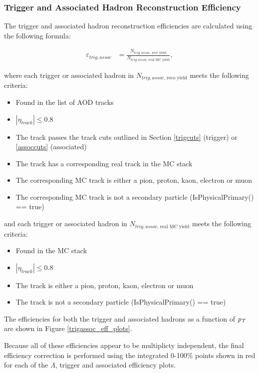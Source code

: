 \documentclass[ALICE,manyauthors]{ALICE_analysis_notes}
\begin{document}
\subsubsection{Trigger and Associated Hadron Reconstruction Efficiency}
\label{trigassoc_efficiency}

The trigger and associated hadron reconstruction efficiencies are calculated using the following formula:

\begin{align*}
	\varepsilon_{trig, assoc} &=  \frac{N_{trig, assoc\text{, reco yield}}}{N_{trig, assoc\text{, real MC yield}}},
\end{align*}

where each trigger or associated hadron in $N_{trig, assoc\text{, reco yield}}$ meets the following criteria:

\begin{itemize}
	\item Found in the list of AOD tracks
	\item $|\eta_{track}| \leq 0.8$
	\item The track passes the track cuts outlined in Section \ref{trigcuts} (trigger) or \ref{assoccuts} (associated)
	\item The track has a corresponding real track in the MC stack
	\item The corresponding MC track is either a pion, proton, kaon, electron or muon
	\item The corresponding MC track is not a secondary particle (IsPhysicalPrimary() == true)
\end{itemize}

and each trigger or associated hadron in $N_{trig, assoc\text{, real MC yield}}$ meets the following criteria:

\begin{itemize}
	\item Found in the MC stack
	\item $|\eta_{track}| \leq 0.8$
	\item The track is either a pion, proton, kaon, electron or muon
	\item The track is not a secondary particle (IsPhysicalPrimary() == true)
\end{itemize}

The efficiencies for both the trigger and associated hadrons as a function of $\it{p}_T$ are shown in Figure \ref{trigassoc_eff_plots}.

Because all of these efficiencies appear to be multiplicty independent, the final efficiency correction is performed using the integrated 0-100\% points shown in red for each of the $\Lambda$, trigger and associated efficiency plots.
\end{document}

